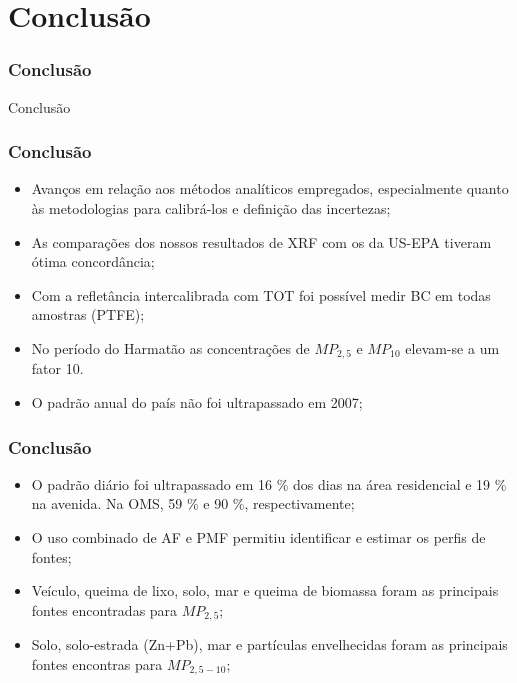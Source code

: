\section{Conclusão}

\begin{frame}
	\frametitle{Conclusão}
	\begin{center}
		\Huge
		Conclusão
	\end{center}
\end{frame}

\begin{frame}
  \frametitle{Conclusão}
  \begin{itemize}
    \item Avanços em relação aos métodos analíticos empregados, especialmente quanto 
    às metodologias para calibrá-los e definição das incertezas;
    \item As comparações dos nossos resultados de XRF com os da US-EPA tiveram ótima concordância;
    \item Com a refletância intercalibrada com TOT foi possível medir BC em todas amostras (PTFE);
    \item No período do Harmatão as concentrações de $MP_{2,5}$ e $MP_{10}$ elevam-se a um fator 10.
    \item O padrão anual do país não foi ultrapassado em 2007;

  \end{itemize}
\end{frame}

\begin{frame}
  \frametitle{Conclusão}
  \begin{itemize}
    \item O padrão diário foi ultrapassado em 16 \% dos dias na área residencial e 19 \% na avenida. Na OMS, 59 \% e 90 \%, respectivamente;
     \item O uso combinado de AF e PMF permitiu identificar e estimar os perfis de fontes;
    \item Veículo, queima de lixo, solo, mar e queima de biomassa foram as principais fontes encontradas para $MP_{2,5}$;
     \item	Solo, solo-estrada (Zn+Pb), mar e partículas envelhecidas foram as principais fontes encontras para $MP_{2,5-10}$;
  \end{itemize}
\end{frame}

